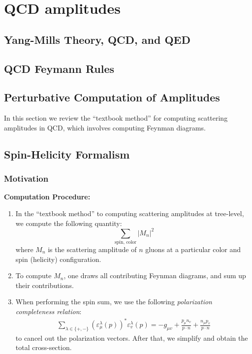 \section{QCD amplitudes}
\label{sec:qcd}

\subsection{Yang-Mills Theory, QCD, and QED}
\label{sec:yang-mills-qcd-qed}


\subsection{QCD Feymann Rules}
\label{sec:qcd-feymann-rules}

\subsection{Perturbative Computation of Amplitudes}

In this section we review the ``textbook method'' for computing scattering amplitudes in QCD, which involves computing Feynman diagrams.


\subsection{Spin-Helicity Formalism}
\label{sec:spin-helicity-formalism}

\subsubsection{Motivation}

\textbf{Computation Procedure:}
\begin{enumerate}
    \item 
In the ``textbook method'' to computing scattering amplitudes at tree-level, we compute the following quantity:
\begin{equation}
    \sum_{\text{spin, color}} |M_n|^2
\end{equation}
where $M_n$ is the scattering amplitude of $n$ gluons at a particular color and spin (helicity) configuration.
\item To compute $M_n$, one draws all contributing Feynman diagrams, and sum up their contributions.

\item When performing the spin sum, we use the following \textit{polarization completeness relation}:
\begin{align}
    \label{eq:pol}
\sum_{\lambda \in\{+,-\}}\left(\varepsilon_\mu^\lambda(p)\right)^* \varepsilon_v^\lambda(p)=-g_{\mu v}+\frac{p_\mu n_v}{p \cdot n}+\frac{n_\mu p_v}{p \cdot n}
\end{align}
to cancel out the polarization vectors. After that, we simplify and obtain the total cross-section.
\end{enumerate}


